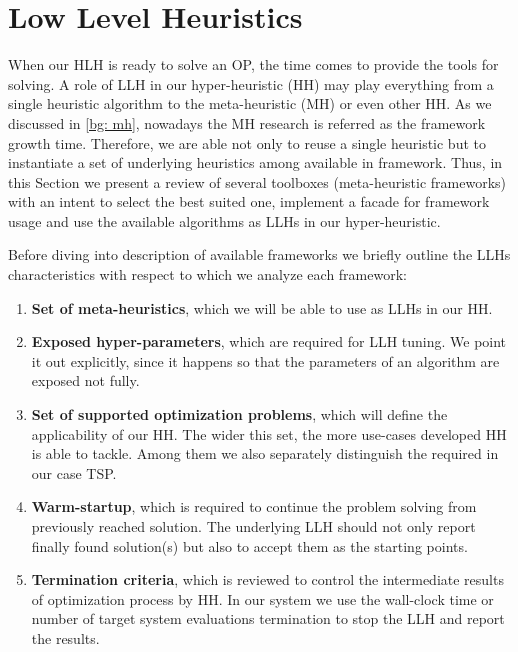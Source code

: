 \section{Low Level Heuristics}\label{impl: LLH}
When our HLH is ready to solve an OP, the time comes to provide the tools for solving. A role of LLH in our hyper-heuristic (HH) may play everything from a single heuristic algorithm to the meta-heuristic (MH) or even other HH. As we discussed in \cref{bg: mh}, nowadays the MH research is referred as the framework growth time. Therefore, we are able not only to reuse a single heuristic but to instantiate a set of underlying heuristics among available in framework. Thus, in this Section we present a review of several toolboxes (meta-heuristic frameworks) with an intent to select the best suited one, implement a facade for framework usage and use the available algorithms as LLHs in our hyper-heuristic.

Before diving into description of available frameworks we briefly outline the LLHs characteristics with respect to which we analyze each framework:
\begin{enumerate}
	\item \textbf{Set of meta-heuristics}, which we will be able to use as LLHs in our HH.
	
	\item \textbf{Exposed hyper-parameters}, which are required for LLH tuning. We point it out explicitly, since it happens so that the parameters of an algorithm are exposed not fully.
	
	\item \textbf{Set of supported optimization problems}, which will define the applicability of our HH. The wider this set, the more use-cases developed HH is able to tackle. Among them we also separately distinguish the required in our case TSP.
	
	\item \textbf{Warm-startup}, which is required to continue the problem solving from previously reached solution. The underlying LLH should not only report finally found solution(s) but also to accept them as the starting points.
	
	\item \textbf{Termination criteria}, which is reviewed to control the intermediate results of optimization process by HH. In our system we use the wall-clock time or number of target system evaluations termination to stop the LLH and report the results.
\end{enumerate}


